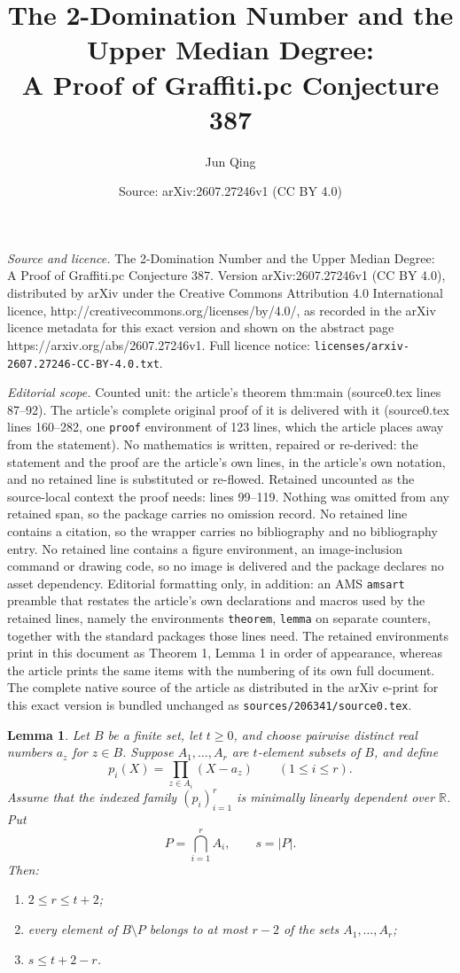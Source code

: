 \documentclass[10pt,a4paper]{amsart}
\title{The 2-Domination Number and the Upper Median Degree:\\ A Proof of Graffiti.pc Conjecture 387}
\author{Jun Qing}
\date{Source: arXiv:2607.27246v1 (CC BY 4.0)}
\newtheorem{lemma}{Lemma}
\begin{document}
\maketitle

\noindent\emph{Source and licence.} The 2-Domination Number and the Upper Median Degree:\\ A Proof of Graffiti.pc Conjecture 387. Version arXiv:2607.27246v1 (CC BY 4.0), distributed by arXiv under the Creative Commons Attribution 4.0 International licence, http://creativecommons.org/licenses/by/4.0/, as recorded in the arXiv licence metadata for this exact version and shown on the abstract page https://arxiv.org/abs/2607.27246v1. Full licence notice: \texttt{licenses/arxiv-2607.27246-CC-BY-4.0.txt}.\par\smallskip

\noindent\textit{Editorial scope.} Counted unit: the article's theorem thm:main (source0.tex lines 87--92). The article's complete original proof of it is delivered with it (source0.tex lines 160--282, one \texttt{proof} environment of 123 lines, which the article places away from the statement). No mathematics is written, repaired or re-derived: the statement and the proof are the article's own lines, in the article's own notation, and no retained line is substituted or re-flowed.  Retained uncounted as the source-local context the proof needs: lines 99--119.  Nothing was omitted from any retained span, so the package carries no omission record.  No retained line contains a citation, so the wrapper carries no bibliography and no bibliography entry.  No retained line contains a figure environment, an image-inclusion command or drawing code, so no image is delivered and the package declares no asset dependency.  Editorial formatting only, in addition: an AMS \texttt{amsart} preamble that restates the article's own declarations and macros used by the retained lines, namely the environments \texttt{theorem}, \texttt{lemma} on separate counters, together with the standard packages those lines need.  The retained environments print in this document as Theorem 1, Lemma 1 in order of appearance, whereas the article prints the same items with the numbering of its own full document.  The complete native source of the article as distributed in the arXiv e-print for this exact version is bundled unchanged as \texttt{sources/206341/source0.tex}.
\begin{lemma}\label{lem:polynomial}
Let $B$ be a finite set, let $t\geq 0$, and choose pairwise distinct real
numbers $a_z$ for $z\in B$.  Suppose $A_1,\ldots,A_r$ are $t$-element
subsets of $B$, and define
\[
  p_i(X)=\prod_{z\in A_i}(X-a_z) \qquad (1\leq i\leq r).
\]
Assume that the indexed family $(p_i)_{i=1}^{r}$ is minimally linearly
dependent over $\mathbb{R}$.  Put
\[
  P=\bigcap_{i=1}^{r}A_i,
  \qquad s=|P|.
\]
Then:
\begin{enumerate}
  \item $2\leq r\leq t+2$;
  \item every element of $B\setminus P$ belongs to at most $r-2$ of the sets
        $A_1,\ldots,A_r$;
  \item $s\leq t+2-r$.
\end{enumerate}
\end{lemma}
\end{document}
